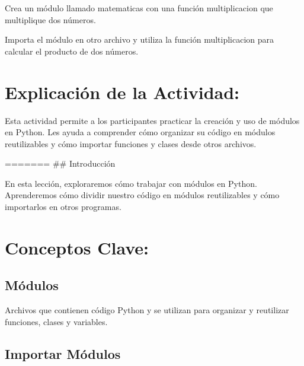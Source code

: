 \documentclass[
  a4paper,
  DIV=11,
  numbers=noendperiod,
  onepage,
  openany]{scrreprt}
\begin{document}
\begin{tcolorbox}[enhanced jigsaw, colbacktitle=quarto-callout-important-color!10!white, toprule=.15mm, leftrule=.75mm, titlerule=0mm, opacityback=0, rightrule=.15mm, opacitybacktitle=0.6, breakable, left=2mm, coltitle=black, title=\textcolor{quarto-callout-important-color}{\faExclamation}\hspace{0.5em}{Actividad Práctica:}, toptitle=1mm, bottomtitle=1mm, arc=.35mm, bottomrule=.15mm, colback=white, colframe=quarto-callout-important-color-frame]

Crea un módulo llamado matematicas con una función multiplicacion que
multiplique dos números.

Importa el módulo en otro archivo y utiliza la función multiplicacion
para calcular el producto de dos números.

\end{tcolorbox}

\hypertarget{explicaciuxf3n-de-la-actividad-56}{%
\section{Explicación de la
Actividad:}\label{explicaciuxf3n-de-la-actividad-56}}

Esta actividad permite a los participantes practicar la creación y uso
de módulos en Python. Les ayuda a comprender cómo organizar su código en
módulos reutilizables y cómo importar funciones y clases desde otros
archivos.

======= \#\# Introducción

En esta lección, exploraremos cómo trabajar con módulos en Python.
Aprenderemos cómo dividir nuestro código en módulos reutilizables y cómo
importarlos en otros programas.

\hypertarget{conceptos-clave-59}{%
\section{Conceptos Clave:}\label{conceptos-clave-59}}

\hypertarget{muxf3dulos-1}{%
\subsection{Módulos}\label{muxf3dulos-1}}

Archivos que contienen código Python y se utilizan para organizar y
reutilizar funciones, clases y variables.

\hypertarget{importar-muxf3dulos-1}{%
\subsection{Importar Módulos}\label{importar-muxf3dulos-1}}
\end{document}
